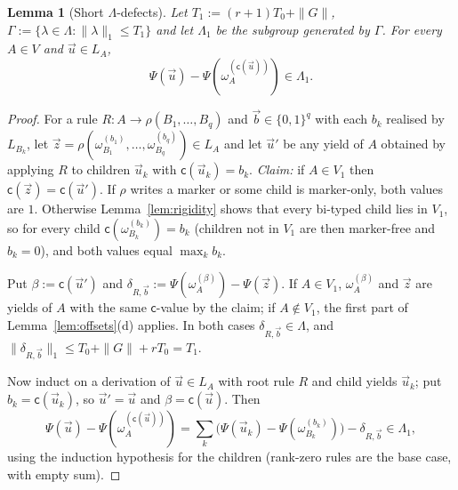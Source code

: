 \documentclass[11pt]{article}
\newtheorem{lemma}[theorem]{Lemma}
\theoremstyle{definition}
\theoremstyle{remark}
\newcommand{\tuple}[1]{\vec{#1}}
\newcommand{\mk}{\mathsf c}
\begin{document}
\begin{lemma}[Short $\Lambda$-defects]\label{lem:split-defects}
Let $T_1:=(r+1)T_0+\|G\|$, $\Gamma:=\{\lambda\in\Lambda:\|\lambda\|_1\le
T_1\}$ and let $\Lambda_1$ be the subgroup generated by $\Gamma$.  For every
$A\in V$ and $\tuple u\in L_A$,
\[
\Psi(\tuple u)-\Psi(\omega^{(\mk(\tuple u))}_A)\in\Lambda_1 .
\]
\end{lemma}
\begin{proof}
For a rule $R:A\to\rho(B_1,\ldots,B_q)$ and $\tuple b\in\{0,1\}^q$ with each
$b_k$ realised by $L_{B_k}$, let
$\tuple z=\rho(\omega^{(b_1)}_{B_1},\ldots,\omega^{(b_q)}_{B_q})\in L_A$ and
let $\tuple u'$ be any yield of $A$ obtained by applying $R$ to children
$\tuple u_k$ with $\mk(\tuple u_k)=b_k$.
\emph{Claim:} if $A\in V_1$ then $\mk(\tuple z)=\mk(\tuple u')$.  If $\rho$
writes a marker or some child is marker-only, both values are $1$.
Otherwise Lemma~\ref{lem:rigidity} shows that every bi-typed child lies in
$V_1$, so for every child $\mk(\omega^{(b_k)}_{B_k})=b_k$ (children not in
$V_1$ are then marker-free and $b_k=0$), and both values equal
$\max_kb_k$.

Put $\beta:=\mk(\tuple u')$ and
$\delta_{R,\tuple b}:=\Psi(\omega^{(\beta)}_A)-\Psi(\tuple z)$.  If
$A\in V_1$, $\omega^{(\beta)}_A$ and $\tuple z$ are yields of $A$ with the
same $\mk$-value by the claim; if $A\notin V_1$, the first part of
Lemma~\ref{lem:offsets}(d) applies.  In both cases
$\delta_{R,\tuple b}\in\Lambda$, and
$\|\delta_{R,\tuple b}\|_1\le T_0+\|G\|+rT_0=T_1$.

Now induct on a derivation of $\tuple u\in L_A$ with root rule $R$ and
child yields $\tuple u_k$; put $b_k=\mk(\tuple u_k)$, so $\tuple u'=\tuple u$
and $\beta=\mk(\tuple u)$.  Then
\[
\Psi(\tuple u)-\Psi(\omega^{(\mk(\tuple u))}_A)
=\sum_k\bigl(\Psi(\tuple u_k)-\Psi(\omega^{(b_k)}_{B_k})\bigr)
 -\delta_{R,\tuple b}\in\Lambda_1 ,
\]
using the induction hypothesis for the children (rank-zero rules are the
base case, with empty sum).
\end{proof}
\end{document}
